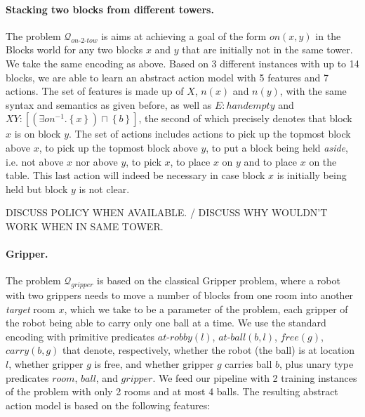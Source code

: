 \documentclass[letterpaper]{article} %
\newcommand{\set}[1]{\ensuremath{\left\{#1 \right\}}}
\newcommand{\Q}{\mathcal{Q}}
\begin{document}
% 

% 

\paragraph{Stacking two blocks from different towers.}
The problem $\Q_{on\text{-}2\text{-}tow}$ is aims at achieving a goal of the form $on(x,y)$
in the Blocks world for any two blocks $x$ and $y$ that are initially not in the same tower.
We take the same encoding as above. Based on 3 different instances with up to 14
blocks, we are able to learn an abstract action model with 5 features and 7 actions.
The set of features is made up of  $X$, $n(x)$ and $n(y)$, with the same syntax and semantics as given before,
as well as $E: handempty$
and $XY: [(\exists on^{-1} . \set{x})\sqcap \set{b}]$,
the second of which precisely denotes that block $x$ is on block $y$.
The set of actions includes actions to pick up the topmost block above $x$, to pick up the topmost block above $y$,
to put a block being held \emph{aside}, i.e. not above $x$ nor above $y$, to pick $x$, 
to place $x$ on $y$ and to place $x$ on the table. This last action will indeed be necessary in case block $x$ is initially being held
but block $y$ is not clear.

DISCUSS POLICY WHEN AVAILABLE. / 
DISCUSS WHY WOULDN'T WORK WHEN IN SAME TOWER.


\paragraph{Gripper.}
The problem $\Q_{gripper}$ is based on the classical Gripper problem, where a robot with two grippers needs to 
move a number of blocks from one room into another \emph{target} room $x$, which we take to be a parameter of the problem,
each gripper of the robot being able to carry only one ball at a time.
We use the standard encoding with primitive predicates $at\text{-}robby(l)$, $at\text{-}ball(b, l)$, $free(g)$, $carry(b, g)$ that denote,
respectively, whether the robot (the ball) is at location $l$, whether gripper $g$ is free, and whether gripper $g$ carries ball $b$,
plus unary type predicates $room$, $ball$, and $gripper$.
%
We feed our pipeline with 2 training instances of the problem with only 2 rooms and at most 4 balls.
The resulting abstract action model is based on the following features:
\end{document}
